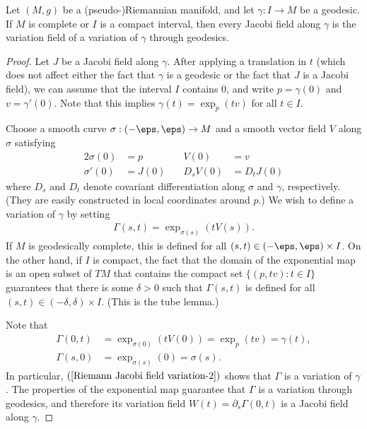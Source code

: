 \begin{proposition}\label{Riemann Jacobi field variation}
Let $(M,g)$ be a (pseudo-)Riemannian manifold, and let $\gamma:I\to M$ be a geodesic. If $M$ is complete or $I$ is a compact interval, then every Jacobi 
field along $\gamma$ is the variation field of a variation of $\gamma$ through geodesics.
\end{proposition}
\begin{proof}
Let $J$ be a Jacobi field along $\gamma$. After applying a translation in $t$ (which does not affect either the fact that $\gamma$ is a geodesic or the fact that $J$ is a Jacobi field), we can assume that the interval $I$ contains $0$, and write $p=\gamma(0)$ and $v=\gamma'(0)$. Note that this implies $\gamma(t)=\exp_p(tv)$ for all $t\in I$.\par
Choose a smooth curve $\sigma:(-\eps,\eps)\to M$ and a smooth vector field $V$ along $\sigma$ satisfying
\begin{alignat*}{2}
\sigma(0)&=p     &\quad V(0)&=v\\
\sigma'(0)&=J(0) &\quad D_sV(0)&=D_tJ(0)
\end{alignat*}
where $D_s$ and $D_t$ denote covariant differentiation along $\sigma$ and $\gamma$, respectively. (They are easily constructed in local coordinates around $p$.) We wish to define a variation of $\gamma$ by setting
\begin{align}\label{Riemann Jacobi field variation-1}
\Gamma(s,t)=\exp_{\sigma(s)}(tV(s)).
\end{align}
If $M$ is geodesically complete, this is defined for all $(s,t)\in(-\eps,\eps)\times I$. On the other hand, if $I$ is compact, the fact that the domain of the exponential 
map is an open subset of $TM$ that contains the compact set $\{(p,tv):t\in I\}$ guarantees that there is some $\delta>0$ such that $\Gamma(s,t)$ is defined for all 
$(s,t)\in(-\delta,\delta)\times I$. (This is the tube lemma.)\par
Note that
\begin{align}
\Gamma(0,t)&=\exp_{\sigma(0)}(tV(0))=\exp_p(tv)=\gamma(t), \label{Riemann Jacobi field variation-2}\\
\Gamma(s,0)&=\exp_{\sigma(s)}(0)=\sigma(s).\label{Riemann Jacobi field variation-3}
\end{align}
In particular, $(\ref{Riemann Jacobi field variation-2})$ shows that $\Gamma$ is a variation of $\gamma$. The properties of the exponential map guarantee that $\Gamma$ 
is a variation through geodesics, and therefore its variation field $W(t)=\partial_s\Gamma(0,t)$ is a Jacobi field along $\gamma$.\par

\end{proof}
